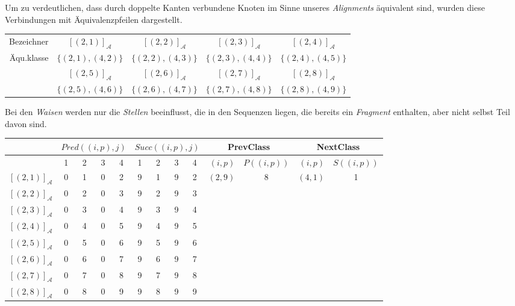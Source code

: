 Um zu verdeutlichen, dass durch doppelte Kanten verbundene Knoten im Sinne unseres \emph{Alignments} äquivalent sind, wurden diese Verbindungen mit Äquivalenzpfeilen dargestellt.

\small
\begin{tabular}{r||c|c|c|c}
	Bezeichner 	& $[(2,1)]_{\mathcal{A}}$ & $[(2,2)]_{\mathcal{A}}$ & $[(2,3)]_{\mathcal{A}}$ & $[(2,4)]_{\mathcal{A}}$\\
	Äqu.klasse  & $\{(2,1),(4,2)\}$	      & $\{(2,2),(4,3)\}$       & $\{(2,3),(4,4)\}$       & $\{(2,4),(4,5)\}$        \\
	\hline
	            & $[(2,5)]_{\mathcal{A}}$ & $[(2,6)]_{\mathcal{A}}$ & $[(2,7)]_{\mathcal{A}}$ & $[(2,8)]_{\mathcal{A}}$\\
	            & $\{(2,5),(4,6)\}$       & $\{(2,6),(4,7)\}$       & $\{(2,7),(4,8)\}$       & $\{(2,8),(4,9)\}$  
\end{tabular}
\normalsize

Bei den \emph{Waisen} werden nur die \emph{Stellen} beeinflusst, die in den Sequenzen liegen, die bereits ein \emph{Fragment} enthalten, aber nicht selbst Teil davon sind.

\vspace{5pt}

\small
\begin{tabular}{r|cccc|cccc||r|c|r|c}
	 & \multicolumn{4}{c|}{$Pred((i,p),j)$} & \multicolumn{4}{c||}{$Succ((i,p),j)$} & \multicolumn{2}{c|}{\textrm{PrevClass}} & \multicolumn{2}{c}{\textrm{NextClass}} \\ \hline
	\diagbox[dir=NW]{$(i,p)$}{$j$} & 1 & 2 & 3 & 4 & 1 & 2 & 3 & 4 & $(i,p)$ & $P((i,p))$ & $(i,p)$ & $S((i,p))$ \\ \hline
	$[(2,1)]_{\mathcal{A}}$ & 0 & 1 & 0 & 2 & 9 & 1 & 9 & 2 & $(2,9)$ & 8 & $(4,1)$ & 1 \\
	$[(2,2)]_{\mathcal{A}}$ & 0 & 2 & 0 & 3 & 9 & 2 & 9 & 3 & & & & \\
	$[(2,3)]_{\mathcal{A}}$ & 0 & 3 & 0 & 4 & 9 & 3 & 9 & 4 & & & & \\
	$[(2,4)]_{\mathcal{A}}$ & 0 & 4 & 0 & 5 & 9 & 4 & 9 & 5 & & & & \\
	$[(2,5)]_{\mathcal{A}}$ & 0 & 5 & 0 & 6 & 9 & 5 & 9 & 6 & & & & \\
	$[(2,6)]_{\mathcal{A}}$ & 0 & 6 & 0 & 7 & 9 & 6 & 9 & 7 & & & & \\
	$[(2,7)]_{\mathcal{A}}$ & 0 & 7 & 0 & 8 & 9 & 7 & 9 & 8 & & & & \\
	$[(2,8)]_{\mathcal{A}}$ & 0 & 8 & 0 & 9 & 9 & 8 & 9 & 9 & & & & 
\end{tabular}
\normalsize
\vspace{5pt}

